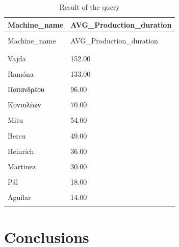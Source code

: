 \documentclass[letterpaper,12pt]{article}
\begin{document}
\begingroup
\renewcommand\arraystretch{0.5}
\begin{longtable}{p{3cm}p{4cm}}
        \caption{Result of the query} \\
        Machine\_name & AVG\_Production\_duration \\
        \endfirsthead \\
        Machine\_name & AVG\_Production\_duration \\
        \endhead \\
        \hline \\
        Vajda & 152.00 \\
        \hline \\
        \color{red} Ramóna & 133.00 \\
        \hline \\
        Παπανδρέου & 96.00 \\
        \hline \\
        Κοντολέων & 70.00 \\
        \hline \\
        Mitu & 54.00 \\
        \hline \\
        Bercu & 49.00 \\
        \hline \\
        Heinrich & 36.00 \\
        \hline \\
        Martinez & 30.00 \\
        \hline \\
        Pál & 18.00 \\
        \hline \\
        Aguilar & 14.00 \\
        \hline \\
\end{longtable} 
\endgroup

\section{Conclusions}


{}

\end{document}
